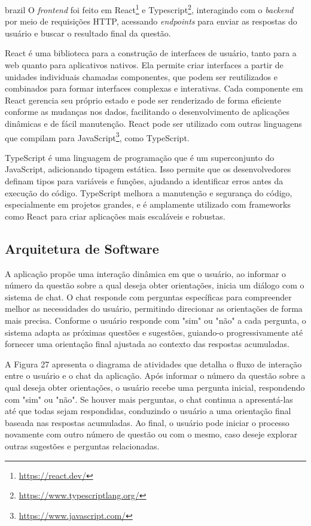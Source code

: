 \begin{otherlanguage*}{brazil}
O \textit{frontend} foi feito em React\footnote{\url{https://react.dev/}} e Typescript\footnote{\url{https://www.typescriptlang.org/}}, interagindo com o \textit{backend} por meio de requisições HTTP, acessando \textit{endpoints} para enviar as respostas do usuário e buscar o resultado final da questão.

React é uma biblioteca para a construção de interfaces de usuário, tanto para a web quanto para aplicativos nativos. Ela permite criar interfaces a partir de unidades individuais chamadas componentes, que podem ser reutilizados e combinados para formar interfaces complexas e interativas. Cada componente em React gerencia seu próprio estado e pode ser renderizado de forma eficiente conforme as mudanças nos dados, facilitando o desenvolvimento de aplicações dinâmicas e de fácil manutenção. React pode ser utilizado com outras linguagens que compilam para JavaScript\footnote{\url{https://www.javascript.com/}}, como TypeScript.

TypeScript é uma linguagem de programação que é um superconjunto do JavaScript, adicionando tipagem estática. Isso permite que os desenvolvedores definam tipos para variáveis e funções, ajudando a identificar erros antes da execução do código. TypeScript melhora a manutenção e segurança do código, especialmente em projetos grandes, e é amplamente utilizado com frameworks como React para criar aplicações mais escaláveis e robustas.

\subsection{Arquitetura de Software}

A aplicação propõe uma interação dinâmica em que o usuário, ao informar o número da questão sobre a qual deseja obter orientações, inicia um diálogo com o sistema de chat. O chat responde com perguntas específicas para compreender melhor as necessidades do usuário, permitindo direcionar as orientações de forma mais precisa. Conforme o usuário responde com "sim" ou "não" a cada pergunta, o sistema adapta as próximas questões e sugestões, guiando-o progressivamente até fornecer uma orientação final ajustada ao contexto das respostas acumuladas.

A Figura 27 apresenta o diagrama de atividades que detalha o fluxo de interação entre o usuário e o chat da aplicação. Após informar o número da questão sobre a qual deseja obter orientações, o usuário recebe uma pergunta inicial, respondendo com "sim" ou "não". Se houver mais perguntas, o chat continua a apresentá-las até que todas sejam respondidas, conduzindo o usuário a uma orientação final baseada nas respostas acumuladas. Ao final, o usuário pode iniciar o processo novamente com outro número de questão ou com o mesmo, caso deseje explorar outras sugestões e perguntas relacionadas.


\end{otherlanguage*}
